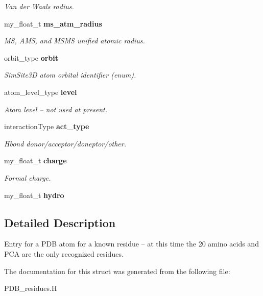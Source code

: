 \begin{CompactItemize}
\begin{CompactList}\small\item\em Van der Waals radius. \item\end{CompactList}\item 
my\_\-float\_\-t \bf{ms\_\-atm\_\-radius}\label{structSimSite3D_1_1pdb__atom__info__t_85cd46506603f9e16859ffb4eb8253f3}

\begin{CompactList}\small\item\em MS, AMS, and MSMS unified atomic radius. \item\end{CompactList}\item 
orbit\_\-type \bf{orbit}\label{structSimSite3D_1_1pdb__atom__info__t_ba6f5c5fe03c00f9a45a75435002ade7}

\begin{CompactList}\small\item\em SimSite3D atom orbital identifier (enum). \item\end{CompactList}\item 
atom\_\-level\_\-type \bf{level}\label{structSimSite3D_1_1pdb__atom__info__t_75a6aa3b87f2a951f126b02ec1c695b4}

\begin{CompactList}\small\item\em Atom level -- not used at present. \item\end{CompactList}\item 
interaction\-Type \bf{act\_\-type}\label{structSimSite3D_1_1pdb__atom__info__t_357e6b496c8772df38cea08b87ffc6ef}

\begin{CompactList}\small\item\em Hbond donor/acceptor/doneptor/other. \item\end{CompactList}\item 
my\_\-float\_\-t \bf{charge}\label{structSimSite3D_1_1pdb__atom__info__t_29b41a3b93a3cae5f1a339eba15fffe2}

\begin{CompactList}\small\item\em Formal charge. \item\end{CompactList}\item 
my\_\-float\_\-t \textbf{hydro}\label{structSimSite3D_1_1pdb__atom__info__t_0e92ea9079ef595893055c25986fd504}

\end{CompactItemize}


\subsection{Detailed Description}
Entry for a PDB atom for a known residue -- at this time the 20 amino acids and PCA are the only recognized residues. 



The documentation for this struct was generated from the following file:\begin{CompactItemize}
\item 
PDB\_\-residues.H\end{CompactItemize}
